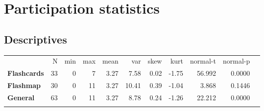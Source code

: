\chapter{Participation statistics}

\section{Descriptives}

\begin{longtable}[c]{@{}lrrrrrrrrrr@{}}
\toprule\addlinespace
& N & min & max & mean & var & skew & kurt & normal-t & normal-p
\\\addlinespace
\midrule\endhead
\textbf{Flashcards} & 33 & 0 & 7 & 3.27 & 7.58 & 0.02 & -1.75 & 56.992 &
0.0000
\\\addlinespace
\textbf{Flashmap} & 30 & 0 & 11 & 3.27 & 10.41 & 0.39 & -1.04 & 3.868 &
0.1446
\\\addlinespace
\textbf{General} & 63 & 0 & 11 & 3.27 & 8.78 & 0.24 & -1.26 & 22.212 &
0.0000
\\\addlinespace
\bottomrule
    \label{tab:dropouts}
\end{longtable}

